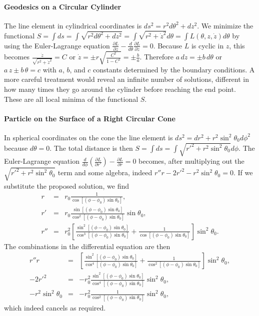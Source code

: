 \documentclass[letterpaper,11pt]{article}
\begin{document}
\paragraph*{Geodesics on a Circular Cylinder}
The line element in cylindrical coordinates is $ds^2 = r^2 d\theta^2 + dz^2$.  We minimize the functional $S = \int ds = \int \sqrt{r^2 d\theta^2 + dz^2} = \int \sqrt{r^2 + \dot{z}^2} d\theta = \int L(\theta,z,\dot{z}) d\theta$ by using the Euler-Lagrange equation $\frac{\partial L}{\partial z} - \frac{d}{d\theta} \frac{\partial L}{\partial \dot{z}} = 0$.  Because $L$ is cyclic in $z$, this becomes $\frac{\dot{z}}{\sqrt{r^2 + \dot{z}^2}} = C$ or $\dot{z} = \pm r \sqrt{\frac{C^2}{1 - C^2}} = \pm \frac{b}{a}$.  Therefore $a\,dz = \pm b\,d\theta$ or $a\,z \pm b\,\theta = c$ with $a$, $b$, and $c$ constants determined by the boundary conditions.  A more careful treatment would reveal an infinite number of solutions, different in how many times they go around the cylinder before reaching the end point.  These are all local minima of the functional $S$.

\paragraph*{Particle on the Surface of a Right Circular Cone}
In spherical coordinates on the cone the line element is $ds^2 = dr^2 + r^2 \sin^2\theta_0 d\phi^2$ because $d\theta = 0$.  The total distance is then $S = \int ds = \int \sqrt{r'^2 + r^2 \sin^2\theta_0} d\phi$.  The Euler-Lagrange equation $\frac{d}{d\phi} \left( \frac{\partial L}{\partial r'} \right) - \frac{\partial L}{\partial r} = 0$ becomes, after multiplying out the $\sqrt{r'^2 + r^2 \sin^2\theta_0}$ term and some algebra, indeed $r'' r - 2 r'^2 - r^2 \sin^2\theta_0 = 0$.  If we substitute the proposed solution, we find
\begin{eqnarray*}
 r   & = & r_0 \frac{1}{\cos\left[(\phi-\phi_0) \sin\theta_0 \right]}, \\
 r'  & = & r_0 \frac{\sin\left[(\phi-\phi_0) \sin\theta_0 \right]}{\cos^2\left[(\phi-\phi_0) \sin\theta_0 \right]} \sin\theta_0, \\
 r'' & = & r_0^2 \left[ \frac{\sin^2\left[(\phi-\phi_0) \sin\theta_0 \right]}{\cos^3\left[(\phi-\phi_0) \sin\theta_0 \right]} +  \frac{1}{\cos\left[(\phi-\phi_0) \sin\theta_0 \right]} \right] \sin^2\theta_0.
\end{eqnarray*}
The combinations in the differential equation are then
\begin{eqnarray*}
 r'' r & = & \left[ \frac{\sin^2\left[(\phi-\phi_0) \sin\theta_0 \right]}{\cos^4\left[(\phi-\phi_0) \sin\theta_0 \right]} +  \frac{1}{\cos^2\left[(\phi-\phi_0) \sin\theta_0 \right]} \right] \sin^2\theta_0, \\
 - 2 r'^2 & = & - r_0^2 \frac{\sin^2\left[(\phi-\phi_0) \sin\theta_0 \right]}{\cos^4\left[(\phi-\phi_0) \sin\theta_0 \right]} \sin^2\theta_0, \\
 - r^2 \sin^2\theta_0 & = & - r_0^2 \frac{1}{\cos^2\left[(\phi-\phi_0) \sin\theta_0 \right]} \sin^2\theta_0,
\end{eqnarray*}
which indeed cancels as required.
\end{document}
